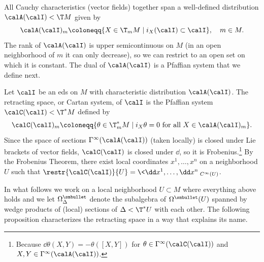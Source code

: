 All Cauchy characteristics (vector fields) together span a well-defined distribution $\calA(\calI)< \T M$ given by 
\[\calA(\calI)_m\coloneqq \{X\in \T_mM\mid i_X(\calI)\subset \calI\},\quad m\in M.\]
The rank of $\calA(\calI)$ is upper semicontinuous on $M$ (in an open neighborhood of $m$ it can only decrease), so we can restrict to an open set on which it is constant. The dual of $\calA(\calI)$ is a Pfaffian system that we define next.

\begin{defn}
    Let $\calI$ be an \gls{eds} on $M$ with characteristic distribution $\calA(\calI)$. The retracting space, or Cartan system, of $\calI$ is the Pfaffian system $\calC(\calI)<\T^\ast M$ defined by 
    \[\calC(\calI)_m\coloneqq \{\theta\in \T^\ast_m M\mid i_X\theta=0 \text{ for all }X\in \calA(\calI)_m\}.\]
    Since the space of sections $\Gamma^\infty(\calA(\calI))$ (taken locally) is closed under Lie brackets of vector fields, $\calC(\calI)$ is closed under $\dd$, so it is Frobenius.\footnote{Because $\dd\theta(X,Y)=-\theta([X,Y])$ for $\theta\in\Gamma^\infty(\calC(\calI))$ and $X,Y\in\Gamma^\infty(\calA(\calI))$.} By the Frobenius Theorem, there exist local coordinates $x^1,\ldots,x^n$ on a neighborhood $U$ such that $\restr{\calC(\calI)}{U}=\<\dd x^1,\ldots,\dd x^n\>_{C^\infty(U)}$.
\end{defn}

In what follows we work on a local neighborhood $U\subset M$ where everything above holds and we let $\Omega^{\smbullet}_\Delta$ denote the subalgebra of $\Omega^{\smbullet}(U)$ spanned by wedge products of (local) sections of $\Delta<\T^\ast U$ with each other. The following proposition characterizes the retracting space in a way that explains its name.

